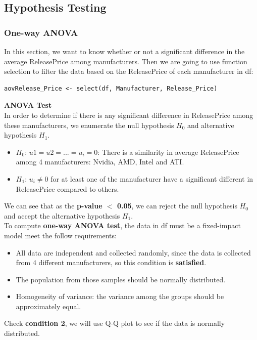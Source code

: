 \documentclass[a4paper]{article}
\theoremstyle{definition}
\begin{document}
\subsection{Hypothesis Testing}
\subsubsection{One-way ANOVA}
In this section, we want to know whether or not a significant difference in the average Release\textunderscore Price among manufacturers. Then we are going to use function selection to filter the data based on the Release\textunderscore Price of each manufacturer in df:
\begin{mdframed}[leftline=false,rightline=false,backgroundcolor=lightblue!10,nobreak=false]
    \begin{verbatim}
aovRelease_Price <- select(df, Manufacturer, Release_Price)
    \end{verbatim}
\end{mdframed}
\textbf{ANOVA Test}\\
In order to determine if there is any significant difference in Release\textunderscore Price among these manufacturers, we enumerate the null hypothesis $H_{0}$ and alternative hypothesis $H_{1}$.
\begin{itemize}
    \item $H_{0}$: $u1 = u2 =...= u_{i} = 0$: There is a similarity in average Release\textunderscore Price among 4 manufacturers: Nvidia, AMD, Intel and ATI.
    \item $H_{1}$: $u_{i} \neq 0$ for at least one of the manufacturer have a significant different in Release\textunderscore Price compared to others.
\end{itemize}

We can see that as the \textbf{p-value $<$ 0.05}, we can reject the null hypothesis $H_{0}$ and accept the alternative hypothesis $H_{1}$.\\
To compute \textbf{one-way ANOVA test}, the data in df must be a fixed-impact model meet the follow requirements:
\begin{itemize}
    \item All data are independent and collected randomly, since the data is collected from 4 different manufacturers, so this condition is \textbf{satisfied}.
    \item The population from those samples should be normally distributed.
    \item Homogeneity of variance: the variance among the groups should be approximately equal.
\end{itemize}
Check \textbf{condition 2}, we will use Q-Q plot to see if the data is normally distributed.
\end{document}
